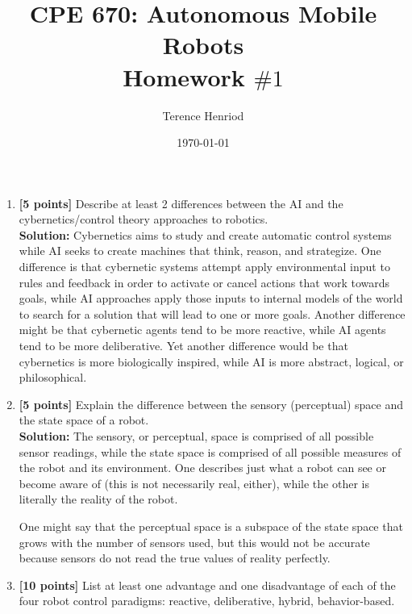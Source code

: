 \documentclass{article}
\title{CPE 670: Autonomous Mobile Robots \\ Homework $\#1$}
\author{Terence Henriod}
\date{\today}
\begin{document}
\maketitle

\newpage
\begin{enumerate}
\item \textbf{[5 points]} Describe at least 2 differences between the AI and the cybernetics/control theory approaches to robotics. \\

\textbf{Solution:} Cybernetics aims to study and create automatic control systems while AI seeks to create machines that think, reason, and strategize. One difference is that cybernetic systems attempt apply environmental input to rules and feedback in order to activate or cancel actions that work towards goals, while AI approaches apply those inputs to internal models of the world to search for a solution that will lead to one or more goals. Another difference might be that cybernetic agents tend to be more reactive, while AI agents tend to be more deliberative. Yet another difference would be that cybernetics is more biologically inspired, while AI is more abstract, logical, or philosophical. \newline \\



\item \textbf{[5 points]} Explain the difference between the sensory (perceptual) space and the state space of a robot. \\

\textbf{Solution:} The sensory, or perceptual, space is comprised of all possible sensor readings, while the state space is comprised of all possible measures of the robot and its environment. One describes just what a robot can see or become aware of (this is not necessarily real, either), while the other is literally the reality of the robot.

One might say that the perceptual space is a subspace of the state space that grows with the number of sensors used, but this would not be accurate because sensors do not read the true values of reality perfectly. \\


\newpage
\item \textbf{[10 points]} List at least one advantage and one disadvantage of each of the four robot control paradigms: reactive, deliberative, hybrid, behavior-based. \\


\end{enumerate}
\end{document}
